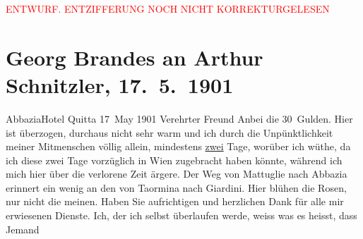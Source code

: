 
\begin{center}
            \textcolor{red}{ENTWURF. ENTZIFFERUNG NOCH NICHT KORREKTURGELESEN}
                      \end{center}
            
               \section[Georg Brandes an Arthur Schnitzler, 17. 5. 1901]{ Georg Brandes an Arthur Schnitzler, 17. 5. 1901}\nopagebreak{}\rehead{ }\begin{ledgroupsized}[t]{13cm}\normalsize\beginnumbering{} \toendnotes[C]{\smallbreak\pagebreak[2]} 
\pstart
           \noindent{}\centering{}{\pb}AbbaziaHotel Quitta\pend
           \pstart
           \raggedleft{}17 May 1901\pend
           \pstart{}Verehrter Freund\pend\pstart
           Anbei die 30 Gulden. Hier ist überzogen, durchaus nicht sehr warm und ich durch
                    die Unpünktlichkeit meiner Mitmenschen völlig allein, mindestens \uline{zwei} Tage, worüber ich wüthe, da ich diese zwei Tage
                    vorzüglich in Wien zugebracht haben könnte,
                    während ich mich hier über die verlorene Zeit ärgere.\pend
           \pstart
           Der Weg von Mattuglie nach Abbazia erinnert ein wenig an den von Taormina nach Giardini.
                    Hier blühen die Rosen, nur nicht die meinen.\pend
           \pstart
           Haben Sie aufrichtigen und herzlichen Dank für alle mir erwiesenen Dienste. Ich,
                    der ich selbst überlaufen werde, weiss {\pb}was es heisst, dass Jemand

\end{ledgroupsized}
